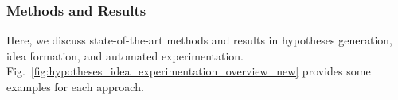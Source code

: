 \subsubsection{Methods and Results}
Here, we discuss state-of-the-art methods and results in hypotheses generation, idea formation, and automated experimentation. Fig.~\ref{fig:hypotheses_idea_experimentation_overview_new} provides some examples for each approach.



